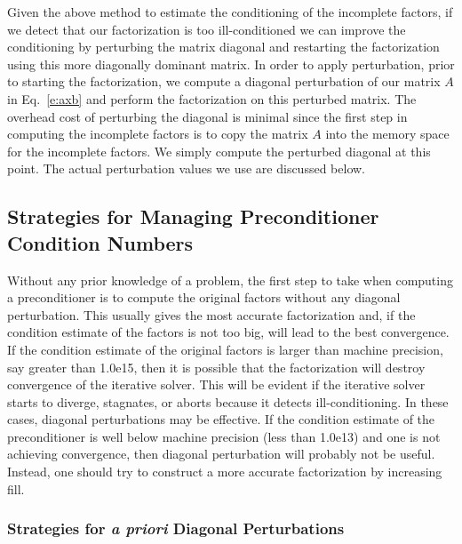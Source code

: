 \documentclass[12pt,relax]{AztecOOUserGuide}
\begin{document}
Given the above method to estimate the conditioning of the incomplete factors,
if we detect that our factorization is too ill-conditioned
we can improve the conditioning by perturbing the matrix diagonal and
restarting the factorization using
this more diagonally dominant matrix.  In order to apply perturbation, 
prior to starting
the factorization, we compute a diagonal perturbation of our matrix
$A$ in Eq.~\ref{e:axb} and perform the factorization on this perturbed
matrix.  The overhead cost of perturbing the diagonal is minimal since
the first step in computing the incomplete factors is to copy the
matrix $A$ into the memory space for the incomplete factors.  We
simply compute the perturbed diagonal at this point.  The actual
perturbation values we use are discussed below.


\subsection{Strategies for Managing Preconditioner Condition Numbers}

Without any prior knowledge of a problem, the first step to take when
computing a preconditioner is to compute the original factors without
any diagonal perturbation.  This usually gives the most accurate
factorization and, if the condition estimate of the factors is not too
big, will lead to the best convergence.  If the condition estimate of
the original factors is larger than machine precision, say greater
than 1.0e15, then it is possible that the factorization will destroy
convergence of the iterative solver.  This will be evident if the
iterative solver starts to diverge, stagnates, or aborts because
it detects ill-conditioning.  In these cases, diagonal perturbations 
may be effective.  If the condition estimate of the preconditioner is 
well below machine precision (less than 1.0e13) and one is not achieving
convergence, then diagonal perturbation will probably not be useful.  
Instead, one should try to construct a more accurate factorization by
increasing fill.

\subsubsection{Strategies for {\bf\it a priori} Diagonal Perturbations}
\end{document}
